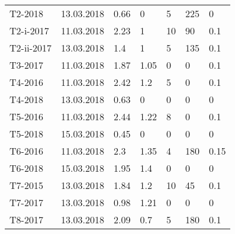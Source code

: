 \begin{tabular}{lllllll}
     T2-2018 &  13.03.2018 &               0.66 &              0 &                 5 &                      225 &                        0 \\
   T2-i-2017 &  11.03.2018 &               2.23 &              1 &                10 &                       90 &                      0.1 \\
  T2-ii-2017 &  13.03.2018 &                1.4 &              1 &                 5 &                      135 &                      0.1 \\
     T3-2017 &  11.03.2018 &               1.87 &           1.05 &                 0 &                        0 &                      0.1 \\
     T4-2016 &  11.03.2018 &               2.42 &            1.2 &                 5 &                        0 &                      0.1 \\
     T4-2018 &  13.03.2018 &               0.63 &              0 &                 0 &                        0 &                        0 \\
     T5-2016 &  11.03.2018 &               2.44 &           1.22 &                 8 &                        0 &                      0.1 \\
     T5-2018 &  15.03.2018 &               0.45 &              0 &                 0 &                        0 &                        0 \\
     T6-2016 &  11.03.2018 &                2.3 &           1.35 &                 4 &                      180 &                     0.15 \\
     T6-2018 &  15.03.2018 &               1.95 &            1.4 &                 0 &                        0 &                        0 \\
     T7-2015 &  13.03.2018 &               1.84 &            1.2 &                10 &                       45 &                      0.1 \\
     T7-2017 &  13.03.2018 &               0.98 &           1.21 &                 0 &                        0 &                        0 \\
     T8-2017 &  13.03.2018 &               2.09 &            0.7 &                 5 &                      180 &                      0.1 \\
\bottomrule
\end{tabular}
